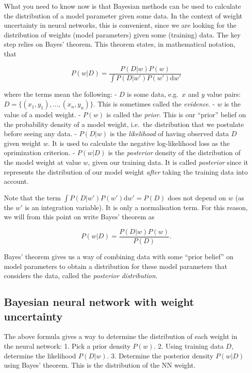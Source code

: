 \documentclass[11pt]{article}
\begin{document}
What you need to know now is that Bayesian methods can be used to
calculate the distribution of a model parameter given some data. In the
context of weight uncertainty in neural networks, this is convenient,
since we are looking for the distribution of weights (model parameters)
given some (training) data. The key step relies on Bayes' theorem. This
theorem states, in mathematical notation, that

\[ P(w | D) = \frac{P(D | w) P(w)}{\int P(D | w') P(w') \text{d}w'} \]

where the terms mean the following: - \(D\) is some data, e.g.~\(x\) and
\(y\) value pairs: \(D = \{(x_1, y_1), \ldots, (x_n, y_n)\}\). This is
sometimes called the \emph{evidence}. - \(w\) is the value of a model
weight. - \(P(w)\) is called the \emph{prior}. This is our ``prior''
belief on the probability density of a model weight, i.e.~the
distribution that we postulate before seeing any data. - \(P(D | w)\) is
the \emph{likelihood} of having observed data \(D\) given weight \(w\).
It is used to calculate the negative log-likelihood loss as the
oprimization criterion. - \(P(w | D)\) is the \emph{posterior} density
of the distribution of the model weight at value \(w\), given our
training data. It is called \emph{posterior} since it represents the
distribution of our model weight \emph{after} taking the training data
into account.

Note that the term \({\int P(D | w') P(w') \text{d}w'} = P(D)\) does not
depend on \(w\) (as the \(w'\) is an integration variable). It is only a
normalisation term. For this reason, we will from this point on write
Bayes' theorem as

\[ P(w | D) = \frac{P(D | w) P(w)}{P(D)}. \]

Bayes' theorem gives us a way of combining data with some ``prior
belief'' on model parameters to obtain a distribution for these model
parameters that considers the data, called the \emph{posterior
distribution}.

    \hypertarget{bayesian-neural-network-with-weight-uncertainty}{%
\subsection{Bayesian neural network with weight
uncertainty}\label{bayesian-neural-network-with-weight-uncertainty}}

The above formula gives a way to determine the distribution of each
weight in the neural network: 1. Pick a prior density \(P(w)\). 2. Using
training data \(D\), determine the likelihood \(P(D | w)\). 3. Determine
the posterior density \(P(w | D)\) using Bayes' theorem. This is the
distribution of the NN weight.
\end{document}
